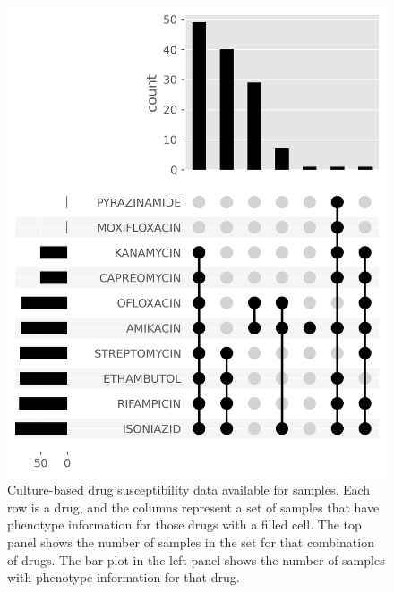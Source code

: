 \begin{figure}
\begin{center}
\includegraphics[width=0.90\columnwidth]{Chapter3/Figs/available_dst.png}
\caption{{Culture-based drug susceptibility data available for samples. Each row is a drug, and the columns represent a set of samples that have phenotype information for those drugs with a filled cell. The top panel shows the number of samples in the set for that combination of drugs. The bar plot in the left panel shows the number of samples with phenotype information for that drug.
{\label{fig:available-dst}}
}}
\end{center}
\end{figure}
